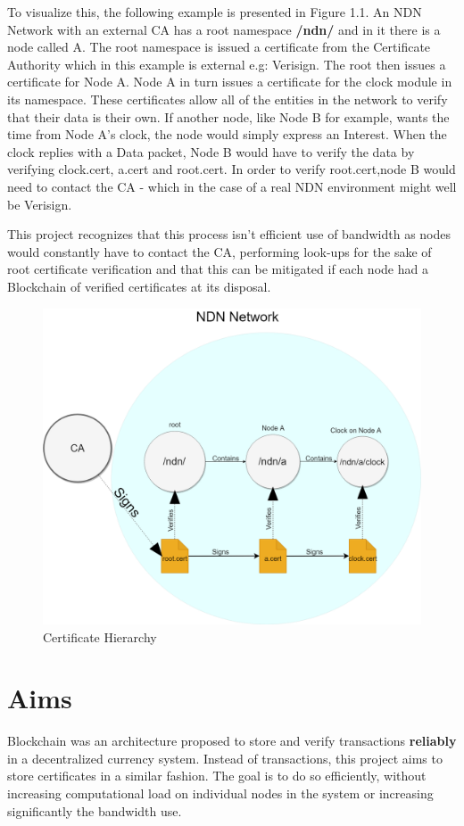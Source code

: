 To visualize this, the following example is presented in Figure 1.1. An NDN Network with an external CA has a root namespace \textbf{/ndn/} and in it there is a node called A. The root namespace is issued a certificate from the Certificate Authority which in this example is external e.g: Verisign. The root then issues a certificate for Node A. Node A in turn issues a certificate for the clock module in its namespace. These certificates allow all of the entities in the network to verify that their data is their own. If another node, like Node B for example, wants the time from Node A's clock, the node would simply express an Interest. When the clock replies with a Data packet, Node B would have to verify the data by verifying clock.cert, a.cert and root.cert. In order to verify root.cert,node B would need to contact the CA - which in the case of a real NDN environment might well be Verisign.\par
 This project recognizes that this process isn't efficient use of bandwidth as nodes would constantly have to contact the CA, performing look-ups for the sake of root certificate verification and that this can be mitigated if each node had a Blockchain of verified certificates at its disposal.
\begin{figure}[ht]
\centering
\includegraphics[width=6in,left]{certarch.png}
\caption{Certificate Hierarchy}
\end{figure}

\section{Aims}
Blockchain was an architecture proposed to store and verify transactions \textbf{reliably} in a decentralized currency system. Instead of transactions, this project aims to store certificates in a similar fashion. The goal is to do so efficiently, without increasing computational load on individual nodes in the system or increasing significantly the bandwidth use.

